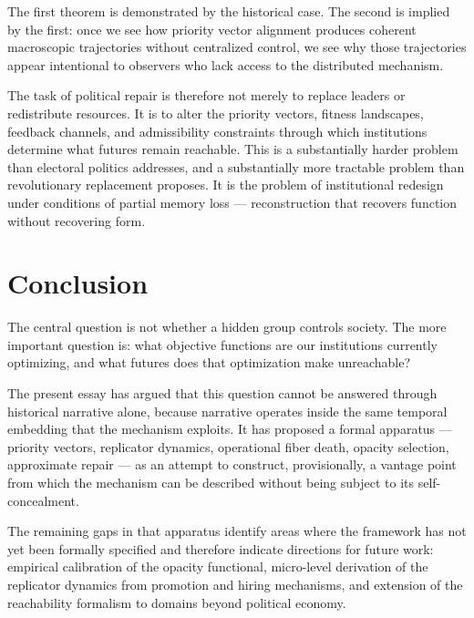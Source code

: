 \documentclass[12pt, a4paper]{article}
\theoremstyle{named}
\begin{document}
The first theorem is demonstrated by the historical case. The second is
implied by the first: once we see how priority vector alignment produces
coherent macroscopic trajectories without centralized control, we see
why those trajectories appear intentional to observers who lack access
to the distributed mechanism.

The task of political repair is therefore not merely to replace leaders
or redistribute resources. It is to alter the priority vectors, fitness
landscapes, feedback channels, and admissibility constraints through
which institutions determine what futures remain reachable. This is a
substantially harder problem than electoral politics addresses, and a
substantially more tractable problem than revolutionary replacement
proposes. It is the problem of institutional redesign under conditions
of partial memory loss — reconstruction that recovers function without
recovering form.

\section*{Conclusion}

The central question is not whether a hidden group controls society.
The more important question is: what objective functions are our
institutions currently optimizing, and what futures does that
optimization make unreachable?

The present essay has argued that this question cannot be answered
through historical narrative alone, because narrative operates inside
the same temporal embedding that the mechanism exploits. It has
proposed a formal apparatus — priority vectors, replicator dynamics,
operational fiber death, opacity selection, approximate repair — as an
attempt to construct, provisionally, a vantage point from which the
mechanism can be described without being subject to its
self-concealment.

The remaining gaps in that apparatus identify areas where the framework
has not yet been formally specified and therefore indicate directions for
future work: empirical calibration of the opacity functional, micro-level
derivation of the replicator dynamics from promotion and hiring
mechanisms, and extension of the reachability formalism to domains
beyond political economy.
\end{document}

